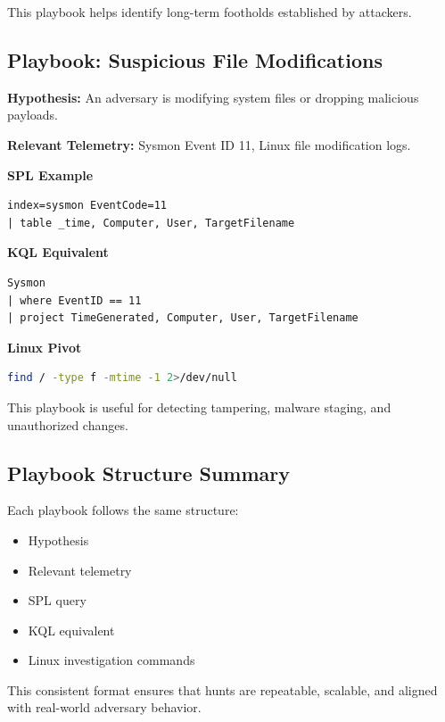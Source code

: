 This playbook helps identify long-term footholds established by attackers.

\subsection*{Playbook: Suspicious File Modifications}

\textbf{Hypothesis:} An adversary is modifying system files or dropping malicious payloads.

\textbf{Relevant Telemetry:} Sysmon Event ID 11, Linux file modification logs.

\textbf{SPL Example}
\begin{lstlisting}
index=sysmon EventCode=11
| table _time, Computer, User, TargetFilename
\end{lstlisting}

\textbf{KQL Equivalent}
\begin{lstlisting}
Sysmon
| where EventID == 11
| project TimeGenerated, Computer, User, TargetFilename
\end{lstlisting}

\textbf{Linux Pivot}
\begin{lstlisting}[language=bash]
find / -type f -mtime -1 2>/dev/null
\end{lstlisting}

This playbook is useful for detecting tampering, malware staging, and unauthorized changes.

\subsection*{Playbook Structure Summary}

Each playbook follows the same structure:
\begin{itemize}
    \item Hypothesis
    \item Relevant telemetry
    \item SPL query
    \item KQL equivalent
    \item Linux investigation commands
\end{itemize}

This consistent format ensures that hunts are repeatable, scalable, and aligned with real-world adversary behavior.
